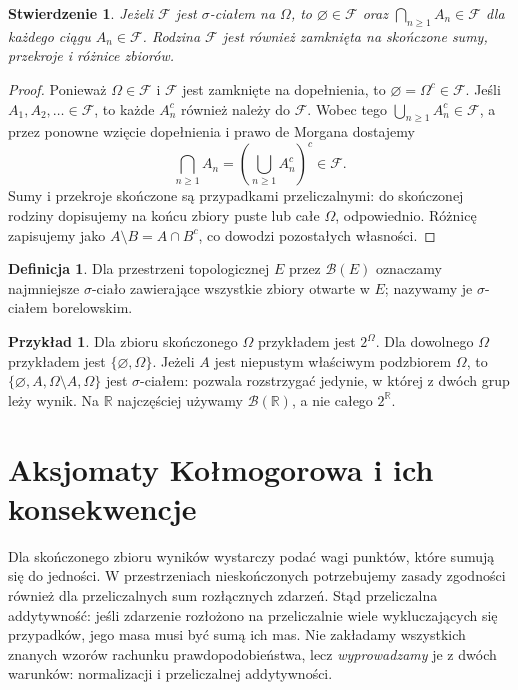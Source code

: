 \documentclass[11pt,a4paper,oneside]{report}
\numberwithin{equation}{chapter}
\theoremstyle{plain}
\newtheorem{stwierdzenie}[twierdzenie]{Stwierdzenie}
\theoremstyle{definition}
\newtheorem{definicja}{Definicja}[chapter]
\newtheorem{przyklad}{Przykład}[chapter]
\theoremstyle{remark}
\newcommand{\R}{\mathbb{R}}
\begin{document}
\begin{stwierdzenie}
Jeżeli $\mathcal F$ jest $\sigma$-ciałem na $\Omega$, to
$\varnothing\in\mathcal F$ oraz $\bigcap_{n\geq1}A_n\in\mathcal F$
dla każdego ciągu $A_n\in\mathcal F$. Rodzina $\mathcal F$ jest
również zamknięta na skończone sumy, przekroje i różnice zbiorów.
\end{stwierdzenie}
\begin{proof}
Ponieważ $\Omega\in\mathcal F$ i $\mathcal F$ jest zamknięte
na dopełnienia, to $\varnothing=\Omega^c\in\mathcal F$.
Jeśli $A_1,A_2,\ldots\in\mathcal F$, to każde
$A_n^c$ również należy do $\mathcal F$. Wobec tego
$\bigcup_{n\geq1}A_n^c\in\mathcal F$, a przez ponowne
wzięcie dopełnienia i prawo de Morgana dostajemy
\[
\bigcap_{n\geq1}A_n
=\left(\bigcup_{n\geq1}A_n^c\right)^c\in\mathcal F.
\]
Sumy i przekroje skończone są przypadkami przeliczalnymi:
do skończonej rodziny dopisujemy na końcu zbiory puste
lub całe $\Omega$, odpowiednio. Różnicę zapisujemy jako
$A\setminus B=A\cap B^c$, co dowodzi pozostałych własności.
\end{proof}

\begin{definicja}
Dla przestrzeni topologicznej $E$ przez $\mathcal B(E)$ oznaczamy
najmniejsze $\sigma$-ciało zawierające wszystkie zbiory otwarte w $E$;
nazywamy je $\sigma$-ciałem borelowskim.
\end{definicja}

\begin{przyklad}
Dla zbioru skończonego $\Omega$ przykładem jest $2^\Omega$.
Dla dowolnego $\Omega$ przykładem jest $\{\varnothing,\Omega\}$.
Jeżeli $A$ jest niepustym właściwym podzbiorem $\Omega$, to
$\{\varnothing,A,\Omega\setminus A,\Omega\}$ jest $\sigma$-ciałem:
pozwala rozstrzygać jedynie, w której z dwóch grup leży wynik.
Na $\R$ najczęściej używamy $\mathcal B(\R)$, a nie całego $2^\R$.
\end{przyklad}

\section{Aksjomaty Kołmogorowa i ich konsekwencje}
Dla skończonego zbioru wyników wystarczy podać wagi punktów,
które sumują się do jedności. W przestrzeniach nieskończonych
potrzebujemy zasady zgodności również dla przeliczalnych sum
rozłącznych zdarzeń. Stąd przeliczalna addytywność: jeśli zdarzenie
rozłożono na przeliczalnie wiele wykluczających się przypadków,
jego masa musi być sumą ich mas. Nie zakładamy wszystkich znanych
wzorów rachunku prawdopodobieństwa, lecz \emph{wyprowadzamy} je
z dwóch warunków: normalizacji i przeliczalnej addytywności.
\end{document}
